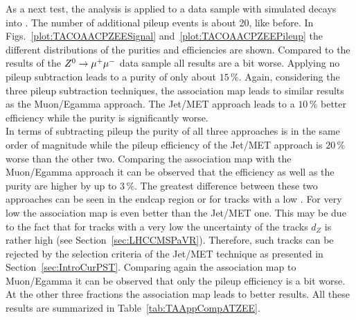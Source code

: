 As a next test, the analysis is applied to a data sample with simulated \Zz decays into \EE. The number of additional pileup events is about 20, like before. In Figs.~\ref{plot:TACOAACPZEESignal} and~\ref{plot:TACOAACPZEEPileup} the different distributions of the purities and efficiencies are shown. Compared to the results of the ${Z^{0}}\rightarrow\mu^+\mu^-$ data sample all results are a bit worse. Applying no pileup subtraction leads to a purity of only about $15\,\%$. Again, considering the three pileup subtraction techniques, the association map leads to similar results as the Muon/Egamma approach. The Jet/MET approach leads to a $10\,\%$ better efficiency while the purity is significantly worse.\\
In terms of subtracting pileup the purity of all three approaches is in the same order of magnitude while the pileup efficiency of the Jet/MET approach is $20\,\%$ worse than the other two. Comparing the association map with the Muon/Egamma approach it can be observed that the efficiency as well as the purity are higher by up to $3\,\%$. The greatest difference between these two approaches can be seen in the endcap region or for tracks with a low \pt. For very low \pt the association map is even better than the Jet/MET one. This may be due to the fact that for tracks with a very low \pt the uncertainty of the tracks $d_{Z}$ is rather high (see Section~\ref{sec:LHCCMSPaVR}). Therefore, such tracks can be rejected by the selection criteria of the Jet/MET technique as presented in Section~\ref{sec:IntroCurPST}. Comparing again the association map to Muon/Egamma it can be observed that only the pileup efficiency is a bit worse. At the other three fractions the association map leads to better results.  All these results are summarized in Table~\ref{tab:TAAppCompATZEE}.

